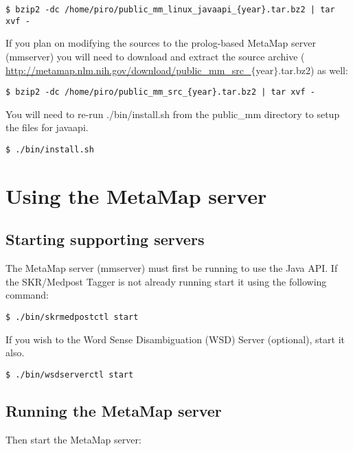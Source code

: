 \documentclass[11pt]{article}
\begin{document}
\begin{verbatim}
$ bzip2 -dc /home/piro/public_mm_linux_javaapi_{year}.tar.bz2 | tar xvf -
\end{verbatim}

If you plan on modifying the sources to the prolog-based MetaMap
server (mmserver) you will need to download and extract the source
archive
( \url{http://metamap.nlm.nih.gov/download/public\_mm\_src\_}\(\{\)year\(\}\).tar.bz2) as
well:

\begin{verbatim}
$ bzip2 -dc /home/piro/public_mm_src_{year}.tar.bz2 | tar xvf -
\end{verbatim}

You will need to re-run ./bin/install.sh from the public\_mm directory
to setup the files for javaapi.

\begin{verbatim}
$ ./bin/install.sh
\end{verbatim}

\section{Using the MetaMap server}
\label{Using the MetaMap server}

\subsection{Starting supporting servers}
\label{Starting supporting servers}

The MetaMap server (mmserver) must first be running to use the Java
API.  If the SKR/Medpost Tagger is not already running start it using
the following command:

\begin{verbatim}
$ ./bin/skrmedpostctl start
\end{verbatim}

If you wish to the Word Sense Disambiguation (WSD) Server (optional),
start it also.

\begin{verbatim}
$ ./bin/wsdserverctl start
\end{verbatim}

\subsection{Running the MetaMap server}
\label{Running the MetaMap server}

Then start the MetaMap server:
\end{document}
